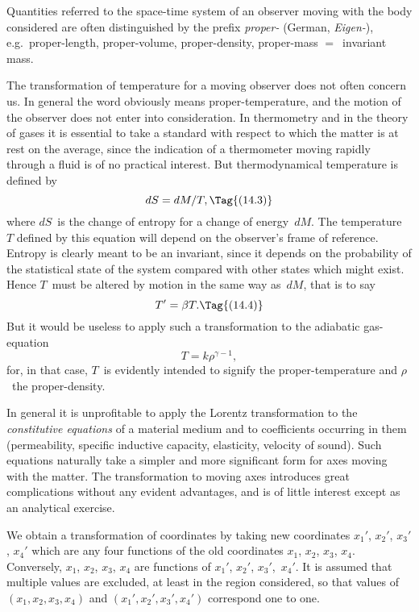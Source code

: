\documentclass[12pt]{book}
\begin{document}
Quantities referred to the space-time system of an observer moving with
%
the body considered are often distinguished by the prefix \emph{proper-} (German,
\emph{Eigen-}), e.g.\ proper-length, proper-volume, proper-density, proper-mass $=$~invariant
mass.

The transformation of temperature for a moving observer does not often
%
concern us. In general the word obviously means proper-temperature, and
the motion of the observer does not enter into consideration. In thermometry
and in the theory of gases it is essential to take a standard with respect to
which the matter is at rest on the average, since the indication of a thermometer
moving rapidly through a fluid is of no practical interest. But
thermodynamical temperature is defined by
\[
dS = dM/T,
\Tag{(14.3)}
\]
where $dS$~is the change of entropy for a change of energy~$dM$. The temperature~$T$
%
defined by this equation will depend on the observer's frame of
reference. Entropy is clearly meant to be an invariant, since it depends on
the probability of the statistical state of the system compared with other
states which might exist. Hence $T$~must be altered by motion in the same
way as~$dM$, that is to say
\[
T' = \beta T.
\Tag{(14.4)}
\]
But it would be useless to apply such a transformation to the adiabatic gas-equation
\[
T = k\rho^{\gamma-1},
\]
for, in that case, $T$~is evidently intended to signify the proper-temperature and
$\rho$~the proper-density.

In general it is unprofitable to apply the Lorentz transformation to the
\emph{constitutive equations} of a material medium and to coefficients occurring in
%
them (permeability, specific inductive capacity, elasticity, velocity of sound).
Such equations naturally take a simpler and more significant form for axes
moving with the matter. The transformation to moving axes introduces great
complications without any evident advantages, and is of little interest except
as an analytical exercise.

%

We obtain a transformation of coordinates by taking new coordinates
%
$x_{1}'$, $x_{2}'$, $x_{3}'$, $x_{4}'$ which are any four functions of the old coordinates $x_{1}$, $x_{2}$, $x_{3}$, $x_{4}$.
Conversely, $x_{1}$, $x_{2}$, $x_{3}$, $x_{4}$ are functions of $x_{1}'$, $x_{2}'$, $x_{3}'$,~$x_{4}'$. It is assumed that
multiple values are excluded, at least in the region considered, so that values
of $(x_{1}, x_{2}, x_{3}, x_{4})$ and $(x_{1}', x_{2}', x_{3}', x_{4}')$ correspond one to one.
\end{document}
